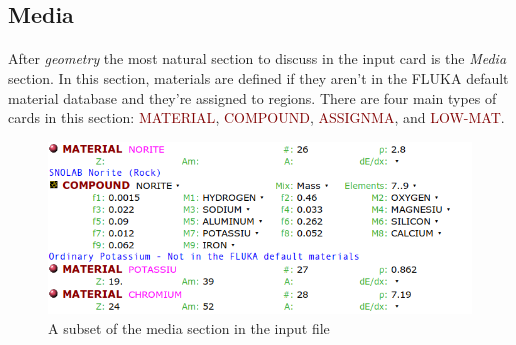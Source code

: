 
\subsection{Media}
\label{sec:Media}
\paragraph{}
After \textit{geometry} the most natural section to discuss in the input card is the \textit{Media} section. In this section, materials are defined if they aren't in the FLUKA default material database and they're assigned to regions. There are four main types of cards in this section: \textcolor{Maroon}{MATERIAL}, \textcolor{Maroon}{COMPOUND}, \textcolor{Maroon}{ASSIGNMA}, and \textcolor{Maroon}{LOW-MAT}. 

\begin{figure}[h]
    \begin{center}
    \includegraphics[scale=0.5]{figures/media_1.png}
    \caption{A subset of the media section in the input file}
    \label{fig:media1}
    \end{center}
\end{figure}

